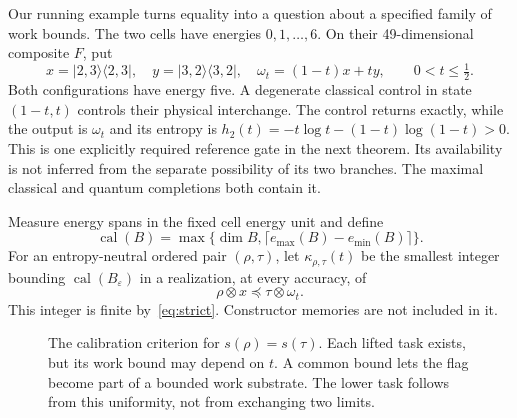 \documentclass[11pt,a4paper]{article}
\DeclareMathOperator{\calB}{cal}
\newcommand{\ket}[1]{\lvert #1\rangle}
\newcommand{\bra}[1]{\langle #1\rvert}
\newcommand{\proj}[1]{\ket{#1}\bra{#1}}
\begin{document}
Our running example turns equality into a question about a specified family of work bounds. The two cells have energies $0,1,\ldots,6$. On their 49-dimensional composite $F$, put
\begin{equation}
 x=\proj{2,3},\quad y=\proj{3,2},\quad
 \omega_t=(1-t)x+ty,\qquad 0<t\le\tfrac12. \label{eq:flag}
\end{equation}
Both configurations have energy five. A degenerate classical control in state $(1-t,t)$ controls their physical interchange. The control returns exactly, while the output is $\omega_t$ and its entropy is $h_2(t)=-t\log t-(1-t)\log(1-t)>0$. This is one explicitly required reference gate in the next theorem. Its availability is not inferred from the separate possibility of its two branches. The maximal classical and quantum completions both contain it.

Measure energy spans in the fixed cell energy unit and define
\[
 \calB(B)=\max\{\dim B,\lceil e_{\max}(B)-e_{\min}(B)\rceil\}.
\]
For an entropy-neutral ordered pair $(\rho,\tau)$, let $\kappa_{\rho,\tau}(t)$ be the smallest integer bounding $\calB(B_\varepsilon)$ in a realization, at every accuracy, of
\begin{equation}
 \rho\otimes x\preceq\tau\otimes\omega_t. \label{eq:lifted}
\end{equation}
This integer is finite by~\eqref{eq:strict}. Constructor memories are not included in it.

\begin{figure}[tb]
\centering
{}
\caption{The calibration criterion for $s(\rho)=s(\tau)$. Each lifted task exists, but its work bound may depend on $t$. A common bound lets the flag become part of a bounded work substrate. The lower task follows from this uniformity, not from exchanging two limits.}
\label{fig:flag}
\end{figure}
\end{document}
